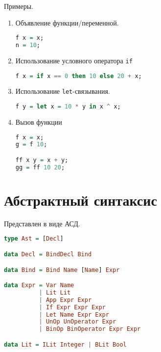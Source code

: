 \documentclass[12pt, a4paper] {ncc}
\begin{document}
Примеры.
\begin{enumerate}
\item Объявление функции/переменной.
\begin{lstlisting}[language=Haskell]
f x = x;
n = 10;
\end{lstlisting}
\item Использование условного оператора \texttt{if}
\begin{lstlisting}[language=Haskell]
f x = if x == 0 then 10 else 20 + x;
\end{lstlisting}

\item Использование \texttt{let}-связывания.
\begin{lstlisting}[language=Haskell]
f y = let x = 10 * y in x ^ x;
\end{lstlisting}
\item Вызов функции
\begin{lstlisting}[language=Haskell]
f x = x;
g = f 10;

ff x y = x + y;
gg = ff 10 20;
\end{lstlisting}
\end{enumerate}

\section{Абстрактный синтаксис}

Представлен в виде АСД.

\begin{lstlisting}[language=Haskell]
type Ast = [Decl]

data Decl = BindDecl Bind

data Bind = Bind Name [Name] Expr

data Expr = Var Name
		  | Lit Lit
          | App Expr Expr
          | If Expr Expr Expr
		  | Let Name Expr Expr
          | UnOp UnOperator Expr
		  | BinOp BinOperator Expr Expr

data Lit = ILit Integer | BLit Bool

\end{lstlisting}
\end{document}
